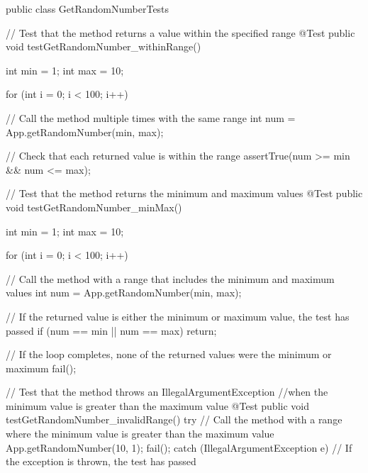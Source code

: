 \documentclass[a4paper]{article}
\begin{document}
 \hspace{-2.5cm}\begin{verbbox}[]
 public class GetRandomNumberTests {
  // Test that the method returns a value within the specified range
  @Test
  public void testGetRandomNumber_withinRange() {
    int min = 1;
    int max = 10;

    for (int i = 0; i < 100; i++) {
      // Call the method multiple times with the same range
      int num = App.getRandomNumber(min, max);

      // Check that each returned value is within the range
      assertTrue(num >= min && num <= max);
    }
  }

  // Test that the method returns the minimum and maximum values
  @Test
  public void testGetRandomNumber_minMax() {
    int min = 1;
    int max = 10;

    for (int i = 0; i < 100; i++) {
      // Call the method with a range that includes the minimum and maximum values
      int num = App.getRandomNumber(min, max);

      // If the returned value is either the minimum or maximum value, the test has passed
      if (num == min || num == max) {
        return;
      }
    }

    // If the loop completes, none of the returned values were the minimum or maximum
    fail();
  }

  // Test that the method throws an IllegalArgumentException 
  //when the minimum value is greater than the maximum value
  @Test
  public void testGetRandomNumber_invalidRange() {
    try {
      // Call the method with a range where the minimum value is greater than the maximum value
      App.getRandomNumber(10, 1);
      fail();
    } catch (IllegalArgumentException e) {
      // If the exception is thrown, the test has passed
    }
  }
}
   \end{verbbox}
   \theverbbox
\newpage
\end{document}
